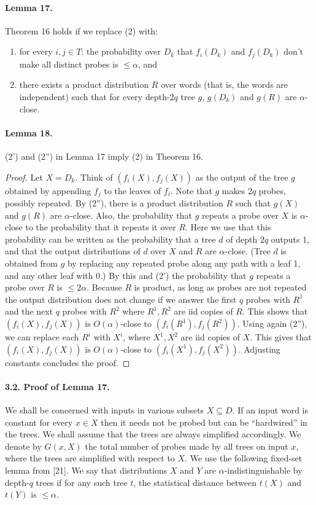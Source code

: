 \paragraph{Lemma 17.}
Theorem 16 holds if we replace (2) with:
\begin{enumerate}
\item[(2')] for every $i,j\in T$: the probability over $D_k$ that $f_i(D_k)$ and $f_j(D_k)$ don't make all distinct probes is $\leq\alpha$, and
\item[(2'')] there exists a product distribution $R$ over words (that is, the words are independent) such that for every depth-$2q$ tree $g$, $g(D_k)$ and $g(R)$ are $\alpha$-close.
\end{enumerate}
\paragraph{Lemma 18.}
(2') and (2'') in Lemma 17 imply (2) in Theorem 16.
\begin{proof}
Let $X=D_k$. Think of $(f_i(X),f_j(X))$ as the output of the tree $g$ obtained by appending $f_j$ to the leaves of $f_i$. Note that $g$ makes $2q$ probes, possibly repeated. By (2''), there is a product distribution $R$ such that $g(X)$ and $g(R)$ are $\alpha$-close. Also, the probability that $g$ repeats a probe over $X$ is $\alpha$-close to the probability that it repeats it over $R$. Here we use that this probability can be written as the probability that a tree $d$ of depth $2q$ outputs 1, and that the output distributions of $d$ over $X$ and $R$ are $\alpha$-close. (Tree $d$ is obtained from $g$ by replacing any repeated probe along any path with a leaf 1, and any other leaf with 0.)
By this and (2') the probability that $g$ repeats a probe over $R$ is $\leq2\alpha$. Because $R$ is product, as long as probes are not repeated the output distribution does not change if we answer the first $q$ probes with $R^1$ and the next $q$ probes with $R^2$ where $R^1,R^2$ are iid copies of $R$. This shows that $(f_i(X),f_j(X))$ is $O(\alpha)$-close to $(f_i(R^1),f_j(R^2))$. Using again (2''), we can replace each $R^i$ with $X^i$, where $X^1,X^2$ are iid copies of $X$. This gives that $(f_i(X),f_j(X))$ is $O(\alpha)$-close to $(f_i(X^1),f_j(X^2))$. Adjusting constants concludes the proof.
\end{proof}
\paragraph{3.2. Proof of Lemma 17.}
We shall be concerned with inputs in various subsets $X\subseteq D$. If an input word is constant for every $x\in X$ then it needs not be probed but can be ``hardwired'' in the trees. We shall assume that the trees are always simplified accordingly. We denote by $G(x,X)$ the total number of probes made by all trees on input $x$, where the trees are simplified with respect to $X$.
We use the following fixed-set lemma from [21]. We say that distributions $X$ and $Y$ are $\alpha$-indistinguishable by depth-$q$ trees if for any such tree $t$, the statistical distance between $t(X)$ and $t(Y)$ is $\leq\alpha$.
